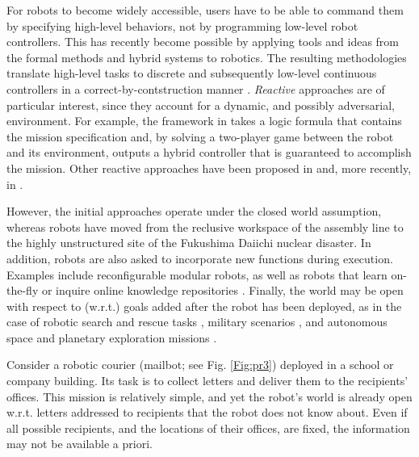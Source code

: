 For robots to become widely accessible, users have to be able to command them by specifying high-level behaviors, not by programming low-level robot controllers.
This has recently become possible by applying tools and ideas from the formal methods and hybrid systems to robotics. The resulting methodologies translate high-level tasks to discrete and subsequently low-level continuous controllers in a correct-by-contstruction manner \cite{BBEFKP06}.
\emph{Reactive} approaches are of particular interest, since they account for a dynamic, and possibly adversarial, environment. For example, the framework in \cite{KGFP_TRO09} takes a logic formula that contains the mission specification and, by solving a two-player game between the robot and its environment, outputs a hybrid controller that is guaranteed to accomplish the mission. Other reactive approaches have been proposed in \cite{Wongpiromsarn2010} and, more recently, in \cite{Belta2013RSS}.

However, the initial approaches operate under the closed world assumption, whereas robots have moved from the reclusive workspace of the assembly line to the highly unstructured site of the Fukushima Daiichi nuclear disaster. 
In addition, robots are also asked to incorporate new functions during execution. 
Examples include reconfigurable modular robots, as well as robots that learn on-the-fly \cite{SaxenaIJRR2012} or inquire online knowledge repositories \cite{rapyuta2013}. 
Finally, the world may be open with respect to (w.r.t.) goals added after the robot has been deployed, as in the case of robotic search and rescue tasks \cite{MatthiasAI2010}, military scenarios \cite{gda2013}, and autonomous space and planetary exploration missions \cite{spaceXplore2006}. 

\begin{myExample}\label{Ex:mailbot1}
Consider a robotic courier (mailbot; see Fig. \ref{Fig:pr3}) deployed in a school or company building. 
Its task is to collect letters and deliver them to the recipients' offices. 
This mission is relatively simple, and yet the robot's world is already open w.r.t. letters addressed to recipients that the robot does not know about. %
Even if all possible recipients, and the locations of their offices, are fixed, the information may not be available a priori.
\end{myExample}

